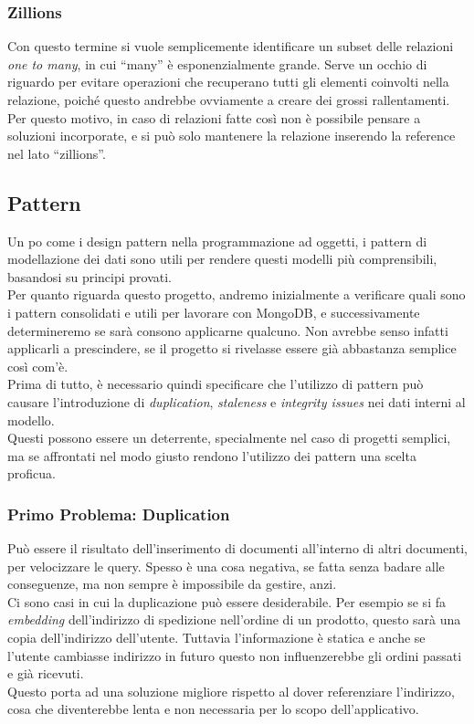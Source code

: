 \subsubsection{Zillions}
Con questo termine si vuole semplicemente identificare un subset delle relazioni \textit{one to many}, in cui ``many'' è esponenzialmente grande. Serve un occhio di riguardo per evitare operazioni che recuperano tutti gli elementi coinvolti nella relazione, poiché questo andrebbe ovviamente a creare dei grossi rallentamenti.
Per questo motivo, in caso di relazioni fatte così non è possibile pensare a soluzioni incorporate, e si può solo mantenere la relazione inserendo la reference nel lato ``zillions''.

\subsection{Pattern}
Un po come i \gls{design pattern} nella programmazione ad oggetti, i pattern di modellazione dei dati sono utili per rendere questi modelli più comprensibili, basandosi su principi provati.\\
Per quanto riguarda questo progetto, andremo inizialmente a verificare quali sono i pattern consolidati e utili per lavorare con MongoDB, e successivamente determineremo se sarà consono applicarne qualcuno. Non avrebbe senso infatti applicarli a prescindere, se il progetto si rivelasse essere già abbastanza semplice così com'è.\\

\noindent Prima di tutto, è necessario quindi specificare che l'utilizzo di pattern può causare l'introduzione di \textit{duplication}, \textit{staleness} e \textit{integrity issues} nei dati interni al modello.\\
Questi possono essere un deterrente, specialmente nel caso di progetti semplici, ma se affrontati nel modo giusto rendono l'utilizzo dei pattern una scelta proficua.\\

\subsubsection{Primo Problema: Duplication}
Può essere il risultato dell'inserimento di documenti all'interno di altri documenti, per velocizzare le query. Spesso è una cosa negativa, se fatta senza badare alle conseguenze, ma non sempre è impossibile da gestire, anzi.\\

\noindent Ci sono casi in cui la duplicazione può essere desiderabile. Per esempio se si fa \textit{embedding} dell'indirizzo di spedizione nell'ordine di un prodotto, questo sarà una copia dell'indirizzo dell'utente. Tuttavia l'informazione è statica e anche se l'utente cambiasse indirizzo in futuro questo non influenzerebbe gli ordini passati e già ricevuti.\\
Questo porta ad una soluzione migliore rispetto al dover referenziare l'indirizzo, cosa che diventerebbe lenta e non necessaria per lo scopo dell'applicativo.\\

